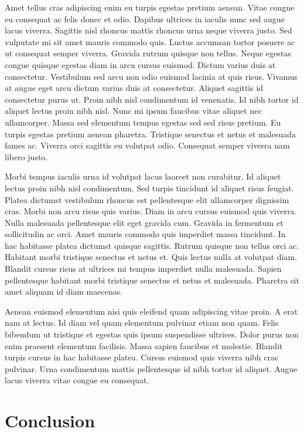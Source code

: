 \documentclass[
]{article}
\begin{document}
Amet tellus cras adipiscing enim eu turpis egestas pretium aenean. Vitae congue eu consequat ac felis donec et odio. Dapibus ultrices in iaculis nunc sed augue lacus viverra. Sagittis nisl rhoncus mattis rhoncus urna neque viverra justo. Sed vulputate mi sit amet mauris commodo quis. Luctus accumsan tortor posuere ac ut consequat semper viverra. Gravida rutrum quisque non tellus. Neque egestas congue quisque egestas diam in arcu cursus euismod. Dictum varius duis at consectetur. Vestibulum sed arcu non odio euismod lacinia at quis risus. Vivamus at augue eget arcu dictum varius duis at consectetur. Aliquet sagittis id consectetur purus ut. Proin nibh nisl condimentum id venenatis. Id nibh tortor id aliquet lectus proin nibh nisl. Nunc mi ipsum faucibus vitae aliquet nec ullamcorper. Massa sed elementum tempus egestas sed sed risus pretium. Eu turpis egestas pretium aenean pharetra. Tristique senectus et netus et malesuada fames ac. Viverra orci sagittis eu volutpat odio. Consequat semper viverra nam libero justo.

Morbi tempus iaculis urna id volutpat lacus laoreet non curabitur. Id aliquet lectus proin nibh nisl condimentum. Sed turpis tincidunt id aliquet risus feugiat. Platea dictumst vestibulum rhoncus est pellentesque elit ullamcorper dignissim cras. Morbi non arcu risus quis varius. Diam in arcu cursus euismod quis viverra. Nulla malesuada pellentesque elit eget gravida cum. Gravida in fermentum et sollicitudin ac orci. Amet mauris commodo quis imperdiet massa tincidunt. In hac habitasse platea dictumst quisque sagittis. Rutrum quisque non tellus orci ac. Habitant morbi tristique senectus et netus et. Quis lectus nulla at volutpat diam. Blandit cursus risus at ultrices mi tempus imperdiet nulla malesuada. Sapien pellentesque habitant morbi tristique senectus et netus et malesuada. Pharetra sit amet aliquam id diam maecenas.

Aenean euismod elementum nisi quis eleifend quam adipiscing vitae proin. A erat nam at lectus. Id diam vel quam elementum pulvinar etiam non quam. Felis bibendum ut tristique et egestas quis ipsum suspendisse ultrices. Dolor purus non enim praesent elementum facilisis. Massa sapien faucibus et molestie. Blandit turpis cursus in hac habitasse platea. Cursus euismod quis viverra nibh cras pulvinar. Urna condimentum mattis pellentesque id nibh tortor id aliquet. Augue lacus viverra vitae congue eu consequat.

\hypertarget{conclusion}{%
\section{Conclusion}\label{conclusion}}
\end{document}
